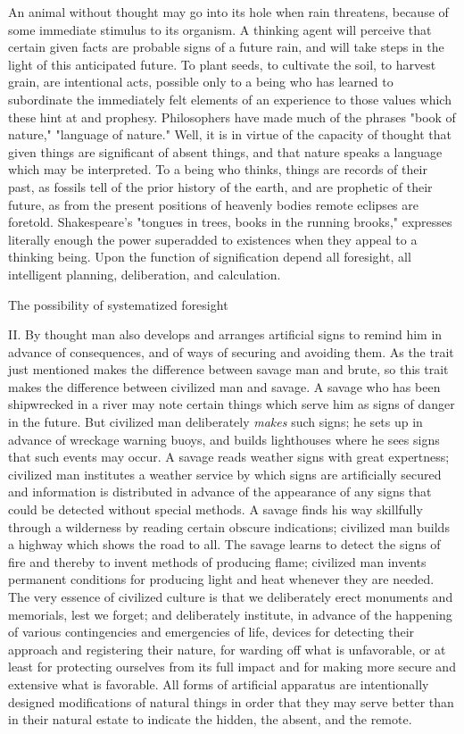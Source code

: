 \documentclass[letterpaper]{book}
\begin{document}
An animal without thought may go into its hole when rain threatens,
because of some immediate stimulus to its organism. A thinking agent
will perceive that certain given facts are probable signs of a future
rain, and will take steps in the light of this anticipated future. To
plant seeds, to cultivate the soil, to harvest grain, are intentional
acts, possible only to a being who has learned to subordinate the
immediately felt elements of an experience to those values which these
hint at and prophesy. Philosophers have made much of the phrases "book
of nature," "language of nature." Well, it is in virtue of the capacity
of thought that given things are significant of absent things, and that
nature speaks a language which may be interpreted. To a being who
thinks, things are records of their past, as fossils tell of the prior
history of the earth, and are prophetic of their future, as from the
present positions of heavenly bodies remote eclipses are foretold.
Shakespeare's "tongues in trees, books in the running brooks," expresses
literally enough the power superadded to existences when they appeal to
a thinking being. Upon the function of signification depend all
foresight, all intelligent planning, deliberation, and calculation.

The possibility of systematized foresight

II. By thought man also develops and arranges artificial signs to remind
him in advance of consequences, and of ways of securing and avoiding
them. As the trait just mentioned makes the difference between savage
man and brute, so this trait makes the difference between civilized man
and savage. A savage who has been shipwrecked in a river may note
certain things
which
serve him as signs of danger in the future. But civilized man
deliberately \emph{makes} such signs; he sets up in advance of wreckage
warning buoys, and builds lighthouses where he sees signs that such
events may occur. A savage reads weather signs with great expertness;
civilized man institutes a weather service by which signs are
artificially secured and information is distributed in advance of the
appearance of any signs that could be detected without special methods.
A savage finds his way skillfully through a wilderness by reading
certain obscure indications; civilized man builds a highway which shows
the road to all. The savage learns to detect the signs of fire and
thereby to invent methods of producing flame; civilized man invents
permanent conditions for producing light and heat whenever they are
needed. The very essence of civilized culture is that we deliberately
erect monuments and memorials, lest we forget; and deliberately
institute, in advance of the happening of various contingencies and
emergencies of life, devices for detecting their approach and
registering their nature, for warding off what is unfavorable, or at
least for protecting ourselves from its full impact and for making more
secure and extensive what is favorable. All forms of artificial
apparatus are intentionally designed modifications of natural things in
order that they may serve better than in their natural estate to
indicate the hidden, the absent, and the remote.
\end{document}
